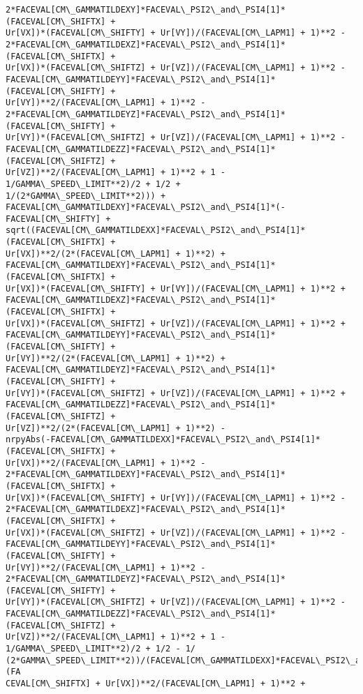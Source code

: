 \documentclass[landscape,letterpaper,10pt,english]{article}
\begin{document}
\begin{Verbatim}[commandchars=\\\{\}]
2*FACEVAL[CM\_GAMMATILDEXY]*FACEVAL\_PSI2\_and\_PSI4[1]*(FACEVAL[CM\_SHIFTX] +
Ur[VX])*(FACEVAL[CM\_SHIFTY] + Ur[VY])/(FACEVAL[CM\_LAPM1] + 1)**2 -
2*FACEVAL[CM\_GAMMATILDEXZ]*FACEVAL\_PSI2\_and\_PSI4[1]*(FACEVAL[CM\_SHIFTX] +
Ur[VX])*(FACEVAL[CM\_SHIFTZ] + Ur[VZ])/(FACEVAL[CM\_LAPM1] + 1)**2 -
FACEVAL[CM\_GAMMATILDEYY]*FACEVAL\_PSI2\_and\_PSI4[1]*(FACEVAL[CM\_SHIFTY] +
Ur[VY])**2/(FACEVAL[CM\_LAPM1] + 1)**2 -
2*FACEVAL[CM\_GAMMATILDEYZ]*FACEVAL\_PSI2\_and\_PSI4[1]*(FACEVAL[CM\_SHIFTY] +
Ur[VY])*(FACEVAL[CM\_SHIFTZ] + Ur[VZ])/(FACEVAL[CM\_LAPM1] + 1)**2 -
FACEVAL[CM\_GAMMATILDEZZ]*FACEVAL\_PSI2\_and\_PSI4[1]*(FACEVAL[CM\_SHIFTZ] +
Ur[VZ])**2/(FACEVAL[CM\_LAPM1] + 1)**2 + 1 - 1/GAMMA\_SPEED\_LIMIT**2)/2 + 1/2 +
1/(2*GAMMA\_SPEED\_LIMIT**2))) +
FACEVAL[CM\_GAMMATILDEXY]*FACEVAL\_PSI2\_and\_PSI4[1]*(-FACEVAL[CM\_SHIFTY] +
sqrt((FACEVAL[CM\_GAMMATILDEXX]*FACEVAL\_PSI2\_and\_PSI4[1]*(FACEVAL[CM\_SHIFTX] +
Ur[VX])**2/(2*(FACEVAL[CM\_LAPM1] + 1)**2) +
FACEVAL[CM\_GAMMATILDEXY]*FACEVAL\_PSI2\_and\_PSI4[1]*(FACEVAL[CM\_SHIFTX] +
Ur[VX])*(FACEVAL[CM\_SHIFTY] + Ur[VY])/(FACEVAL[CM\_LAPM1] + 1)**2 +
FACEVAL[CM\_GAMMATILDEXZ]*FACEVAL\_PSI2\_and\_PSI4[1]*(FACEVAL[CM\_SHIFTX] +
Ur[VX])*(FACEVAL[CM\_SHIFTZ] + Ur[VZ])/(FACEVAL[CM\_LAPM1] + 1)**2 +
FACEVAL[CM\_GAMMATILDEYY]*FACEVAL\_PSI2\_and\_PSI4[1]*(FACEVAL[CM\_SHIFTY] +
Ur[VY])**2/(2*(FACEVAL[CM\_LAPM1] + 1)**2) +
FACEVAL[CM\_GAMMATILDEYZ]*FACEVAL\_PSI2\_and\_PSI4[1]*(FACEVAL[CM\_SHIFTY] +
Ur[VY])*(FACEVAL[CM\_SHIFTZ] + Ur[VZ])/(FACEVAL[CM\_LAPM1] + 1)**2 +
FACEVAL[CM\_GAMMATILDEZZ]*FACEVAL\_PSI2\_and\_PSI4[1]*(FACEVAL[CM\_SHIFTZ] +
Ur[VZ])**2/(2*(FACEVAL[CM\_LAPM1] + 1)**2) -
nrpyAbs(-FACEVAL[CM\_GAMMATILDEXX]*FACEVAL\_PSI2\_and\_PSI4[1]*(FACEVAL[CM\_SHIFTX] +
Ur[VX])**2/(FACEVAL[CM\_LAPM1] + 1)**2 -
2*FACEVAL[CM\_GAMMATILDEXY]*FACEVAL\_PSI2\_and\_PSI4[1]*(FACEVAL[CM\_SHIFTX] +
Ur[VX])*(FACEVAL[CM\_SHIFTY] + Ur[VY])/(FACEVAL[CM\_LAPM1] + 1)**2 -
2*FACEVAL[CM\_GAMMATILDEXZ]*FACEVAL\_PSI2\_and\_PSI4[1]*(FACEVAL[CM\_SHIFTX] +
Ur[VX])*(FACEVAL[CM\_SHIFTZ] + Ur[VZ])/(FACEVAL[CM\_LAPM1] + 1)**2 -
FACEVAL[CM\_GAMMATILDEYY]*FACEVAL\_PSI2\_and\_PSI4[1]*(FACEVAL[CM\_SHIFTY] +
Ur[VY])**2/(FACEVAL[CM\_LAPM1] + 1)**2 -
2*FACEVAL[CM\_GAMMATILDEYZ]*FACEVAL\_PSI2\_and\_PSI4[1]*(FACEVAL[CM\_SHIFTY] +
Ur[VY])*(FACEVAL[CM\_SHIFTZ] + Ur[VZ])/(FACEVAL[CM\_LAPM1] + 1)**2 -
FACEVAL[CM\_GAMMATILDEZZ]*FACEVAL\_PSI2\_and\_PSI4[1]*(FACEVAL[CM\_SHIFTZ] +
Ur[VZ])**2/(FACEVAL[CM\_LAPM1] + 1)**2 + 1 - 1/GAMMA\_SPEED\_LIMIT**2)/2 + 1/2 - 1/
(2*GAMMA\_SPEED\_LIMIT**2))/(FACEVAL[CM\_GAMMATILDEXX]*FACEVAL\_PSI2\_and\_PSI4[1]*(FA
CEVAL[CM\_SHIFTX] + Ur[VX])**2/(FACEVAL[CM\_LAPM1] + 1)**2 +

\end{Verbatim}
\end{document}
